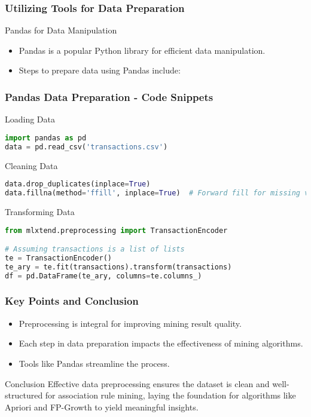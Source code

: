 \documentclass[aspectratio=169]{beamer}
\begin{document}
\begin{frame}[fragile]
    \frametitle{Utilizing Tools for Data Preparation}
    \begin{block}{Pandas for Data Manipulation}
        \begin{itemize}
            \item Pandas is a popular Python library for efficient data manipulation.
            \item Steps to prepare data using Pandas include:
        \end{itemize}
    \end{block}
\end{frame}

\begin{frame}[fragile]
    \frametitle{Pandas Data Preparation - Code Snippets}
    \begin{block}{Loading Data}
        \begin{lstlisting}[language=Python]
import pandas as pd
data = pd.read_csv('transactions.csv')
        \end{lstlisting}
    \end{block}
    
    \begin{block}{Cleaning Data}
        \begin{lstlisting}[language=Python]
data.drop_duplicates(inplace=True)
data.fillna(method='ffill', inplace=True)  # Forward fill for missing values
        \end{lstlisting}
    \end{block}
    
    \begin{block}{Transforming Data}
        \begin{lstlisting}[language=Python]
from mlxtend.preprocessing import TransactionEncoder

# Assuming transactions is a list of lists
te = TransactionEncoder()
te_ary = te.fit(transactions).transform(transactions)
df = pd.DataFrame(te_ary, columns=te.columns_)
        \end{lstlisting}
    \end{block}
\end{frame}

\begin{frame}[fragile]
    \frametitle{Key Points and Conclusion}
    \begin{itemize}
        \item Preprocessing is integral for improving mining result quality.
        \item Each step in data preparation impacts the effectiveness of mining algorithms.
        \item Tools like Pandas streamline the process.
    \end{itemize}
    \begin{block}{Conclusion}
        Effective data preprocessing ensures the dataset is clean and well-structured for association rule mining, laying the foundation for algorithms like Apriori and FP-Growth to yield meaningful insights.
    \end{block}
\end{frame}
\end{document}
